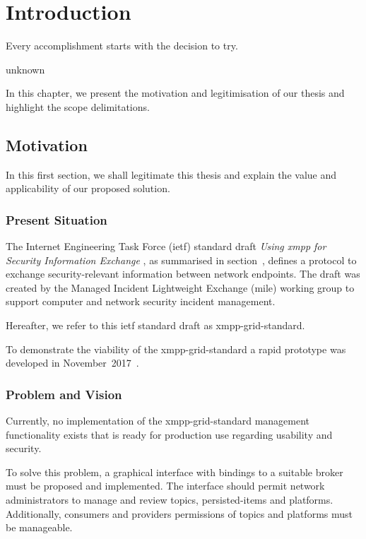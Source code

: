 \newcommand{\code}{\texttt}
\chapter{Introduction}
\label{sec:introduction}

\epigraph{Every accomplishment starts with the decision to try.}{unknown}
In this chapter, we present the motivation and legitimisation of our thesis and highlight the scope delimitations.

\section{Motivation}
In this first section, we shall legitimate this thesis and explain the value and applicability of our proposed solution.

\subsection{Present Situation}
The Internet Engineering Task Force (\gls{ietf}) standard draft \emph{Using \gls{xmpp} for Security Information Exchange} \cite{ietf-mile-xmpp-grid-05}, as summarised in section~, defines a protocol to exchange security-relevant information between network endpoints.
The draft was created by the Managed Incident Lightweight Exchange (\gls{mile}) working group to support computer and network security incident management.

Hereafter, we refer to this \gls{ietf} standard draft as \gls{xmpp-grid-standard}.

To demonstrate the viability of the \gls{xmpp-grid-standard} a rapid prototype was developed in November~2017~\cite{xmpp-grid-prototype}.

\subsection{Problem and Vision}
Currently, no implementation of the \gls{xmpp-grid-standard} management functionality exists that is ready for production use regarding usability and security.

To solve this problem, a graphical interface with bindings to a suitable \gls{broker} must be proposed and implemented.
The interface should permit network administrators to manage and review \glspl{topic}, \glspl{persisted-item} and \glspl{platform}.
Additionally, \glspl{consumer} and \glspl{provider} permissions of \glspl{topic} and \glspl{platform} must be manageable.

